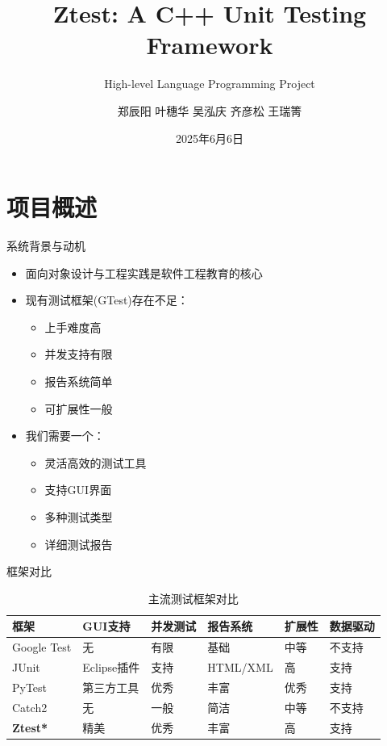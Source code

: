 \documentclass{beamer}
\title{Ztest: A C++ Unit Testing Framework}
\subtitle{High-level Language Programming Project}
\author{郑辰阳 \quad 叶穗华 \quad 吴泓庆 \quad 齐彦松 \quad 王瑞箐}
\institute{未来技术学院 \\ 数据科学与大数据技术}
\date{2025年6月6日}
\begin{document}
\frame{\titlepage}

\section{项目概述}
\begin{frame}{系统背景与动机}
    \begin{itemize}
        \item 面向对象设计与工程实践是软件工程教育的核心
        \item 现有测试框架(GTest)存在不足：
              \begin{itemize}
                  \item 上手难度高
                  \item 并发支持有限
                  \item 报告系统简单
                  \item 可扩展性一般
              \end{itemize}
        \item 我们需要一个：
              \begin{itemize}
                  \item 灵活高效的测试工具
                  \item 支持GUI界面
                  \item 多种测试类型
                  \item 详细测试报告
              \end{itemize}
    \end{itemize}
\end{frame}

\begin{frame}{框架对比}
    \begin{table}
        \centering
        \caption{主流测试框架对比}
        \begin{tabularx}{\textwidth}{lXXXXX}
            \toprule
            \textbf{框架}     & \textbf{GUI支持} & \textbf{并发测试} & \textbf{报告系统} & \textbf{扩展性} & \textbf{数据驱动} \\
            \midrule
            Google Test     & 无              & 有限            & 基础            & 中等           & 不支持           \\
            JUnit           & Eclipse插件      & 支持            & HTML/XML      & 高            & 支持            \\
            PyTest          & 第三方工具          & 优秀            & 丰富            & 优秀           & 支持            \\
            Catch2          & 无              & 一般            & 简洁            & 中等           & 不支持           \\
            \textbf{Ztest*} & 精美             & 优秀            & 丰富            & 高            & 支持            \\
            \bottomrule
        \end{tabularx}
    \end{table}
\end{frame}
\end{document}
